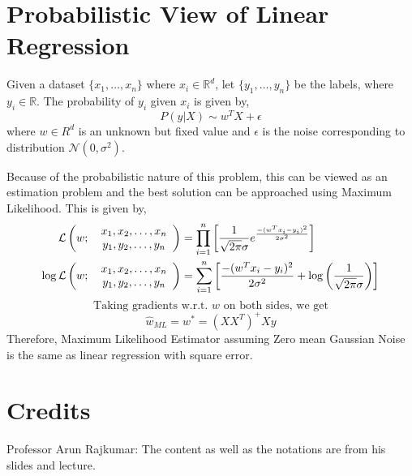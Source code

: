 \documentclass[
]{article}
\begin{document}
\hypertarget{probabilistic-view-of-linear-regression}{%
\section{Probabilistic View of Linear
Regression}\label{probabilistic-view-of-linear-regression}}

Given a dataset \(\{x_1, \ldots, x_n\}\) where \(x_i \in \mathbb{R}^d\),
let \(\{y_1, \ldots, y_n\}\) be the labels, where
\(y_i \in \mathbb{R}\). The probability of \(y_i\) given \(x_i\) is
given by, \[
P(y|X) \sim w^TX + \epsilon
\] where \(w \in R^d\) is an unknown but fixed value and \(\epsilon\) is
the noise corresponding to distribution \(\mathcal{N}(0, \sigma^2)\).

Because of the probabilistic nature of this problem, this can be viewed
as an estimation problem and the best solution can be approached using
Maximum Likelihood. This is given by, \begin{align*}
\mathcal{L}\left(w; \hspace{0.5em} \begin{array}{cccc}
x_1, x_2, \ldots, x_n \\
y_1, y_2, \ldots, y_n\\
\end{array} \right )
&= \prod _{i=1} ^n \left [ \frac{1}{\sqrt{2\pi}\sigma}  e^{\frac{-(w^Tx_i - y_i)^2}{2\sigma^2}} \right ] \\
\log\mathcal{L}\left(w; \hspace{0.5em} \begin{array}{cccc}
x_1, x_2, \ldots, x_n \\
y_1, y_2, \ldots, y_n\\
\end{array} \right )
&= \sum _{i=1} ^n \left [ \frac{-(w^Tx_i - y_i)^2}{2\sigma^2} + \log \left ( \frac{1}{\sqrt{2\pi}\sigma} \right ) \right ]
\end{align*} \[
\text{Taking gradients w.r.t. } w \text{ on both sides, we get}
\] \[
\hat{w}_{ML} = w^* = (XX^T)^+Xy
\] Therefore, Maximum Likelihood Estimator assuming Zero mean Gaussian
Noise is the same as linear regression with square error.

\hypertarget{credits}{%
\section{Credits}\label{credits}}

Professor Arun Rajkumar: The content as well as the notations are from
his slides and lecture.
\end{document}
